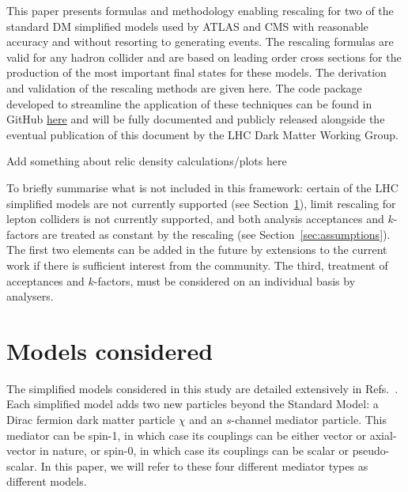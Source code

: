 \documentclass[a4paper, 11pt]{article}
\begin{document}
This paper presents formulas and methodology enabling rescaling for two of the standard DM simplified models used by ATLAS and CMS with reasonable accuracy and without resorting to generating events. The rescaling formulas are valid for any hadron collider and are based on leading order cross sections for the production of the most important final states for these models. The derivation and validation of the rescaling methods are given here. The code package developed to streamline the application of these techniques can be found in GitHub \href{https://github.com/LHC-DMWG/DMWG-couplingScan-code}{here} and will be fully documented and publicly released alongside the eventual publication of this document by the LHC Dark Matter Working Group. 

{\color{red} Add something about relic density calculations/plots here}

To briefly summarise what is not included in this framework: certain of the LHC simplified models are not currently supported (see Section~\ref{sec:models}), limit rescaling for lepton colliders is not currently supported, and both analysis acceptances and $k$-factors are treated as constant by the rescaling (see Section~\ref{sec:assumptions}). The first two elements can be added in the future by extensions to the current work if there is sufficient interest from the community. The third, treatment of acceptances and $k$-factors, must be considered on an individual basis by analysers.

\section{Models considered}
\label{sec:models}

The simplified models considered in this study are detailed extensively in Refs.~\cite{ABERCROMBIE2020100371,ALBERT2019100377}. Each simplified model adds two new particles beyond the Standard Model: a Dirac fermion dark matter particle $\chi$ and an $s$-channel mediator particle. This mediator can be spin-1, in which case its couplings can be either vector or axial-vector in nature, or spin-0, in which case its couplings can be scalar or pseudo-scalar. In this paper, we will refer to these four different mediator types as different models.
\end{document}
